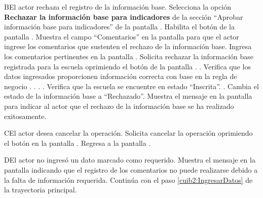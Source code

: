   \begin{UCtrayectoriaA}{B}{El actor rechaza el registro de la información base.}
    \UCpaso[\UCactor] Selecciona la opción {\bf Rechazar la información base para indicadores} de la sección ``Aprobar información base para indicadores'' de la pantalla .
    \UCpaso[\UCsist] Habilita el botón  de la pantalla .
    \UCpaso[\UCsist] Muestra el campo ``Comentarios'' en la pantalla  para que el actor ingrese los comentarios que sustenten el rechazo de la información base.
    \UCpaso[\UCactor] Ingresa los comentarios pertinentes en la pantalla . \label{cuib2:IngresarDatos}
    \UCpaso[\UCactor] Solicita rechazar la información base registrada para la escuela oprimiendo el botón  de la pantalla . .
    \UCpaso[\UCsist] Verifica que los datos ingresados proporcionen información correcta con base en la regla de negocio . . . .
    \UCpaso[\UCsist] Verifica que la escuela se encuentre en estado ``Inscrita''. . 
    \UCpaso[\UCsist] Cambia el estado de la información base a ``Rechazado''.
    \UCpaso[\UCsist] Muestra el mensaje  en la pantalla  para indicar al actor que el rechazo de la información base se ha realizado exitosamente.        
 \end{UCtrayectoriaA}
 
     \begin{UCtrayectoriaA}{C}{El actor desea cancelar la operación.}
    \UCpaso[\UCactor] Solicita cancelar la operación oprimiendo el botón  en la pantalla .
    \UCpaso[\UCsist] Regresa a la pantalla . 
    \end{UCtrayectoriaA}
    
        \begin{UCtrayectoriaA}{D}{El actor no ingresó un dato marcado como requerido.}    
    \UCpaso[\UCsist] Muestra el mensaje  en la pantalla  indicando que el registro de los comentarios no puede realizarse debido a la falta de información requerida.
    \UCpaso[] Continúa con el paso \ref{cuib2:IngresarDatos} de la trayectoria principal.     
    \end{UCtrayectoriaA}
 
